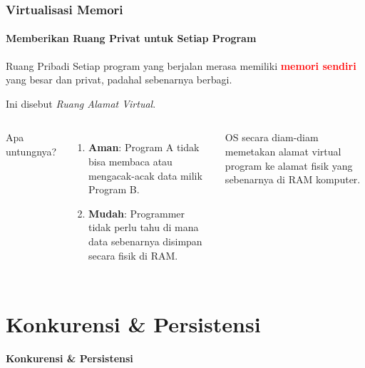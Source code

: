 \documentclass[t,aspectratio=169,xcolor=dvipsnames]{beamer}
\newcommand{\tem}[1]{\textbf{\textcolor{red}{#1}}}
\begin{document}
\begin{frame}[t]
    \frametitle{Virtualisasi Memori}
    \framesubtitle{Memberikan Ruang Privat untuk Setiap Program}
    
    \begin{alertblock}{Ruang Pribadi}
        Setiap program yang berjalan merasa memiliki \tem{memori sendiri} yang besar dan privat, padahal sebenarnya berbagi.
    \end{alertblock}
    \vspace{0.3cm}
    
    \small
    Ini disebut \textit{Ruang Alamat Virtual}.
    
    \begin{columns}[t]
           Apa untungnya?
           \begin{enumerate}
               \item \textbf{Aman}: Program A tidak bisa membaca atau mengacak-acak data milik Program B.
               \item \textbf{Mudah}: Programmer tidak perlu tahu di mana data sebenarnya disimpan secara fisik di RAM.
           \end{enumerate}
            OS secara diam-diam memetakan alamat virtual program ke alamat fisik yang sebenarnya di RAM komputer.
    \end{columns}
\end{frame}

\section{Konkurensi \& Persistensi}

\begin{frame}[plain]
    \begin{center}
        \vspace{3cm}
        \Huge\textbf{Konkurensi \& Persistensi}
    \end{center}
\end{frame}
\end{document}

